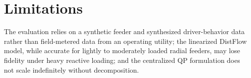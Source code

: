 \section{Limitations}
The evaluation relies on a synthetic feeder and synthesized driver-behavior data rather than
field-metered data from an operating utility; the linearized DistFlow model, while accurate for
lightly to moderately loaded radial feeders, may lose fidelity under heavy reactive loading; and
the centralized QP formulation does not scale indefinitely without decomposition.
